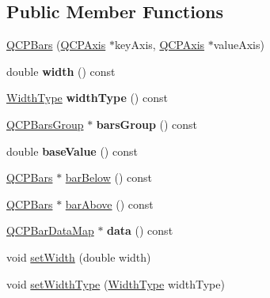 \subsection*{Public Member Functions}
\begin{DoxyCompactItemize}
\item 
\mbox{\hyperlink{class_q_c_p_bars_a64006999ad9dff308f40df41cef176ad}{Q\+C\+P\+Bars}} (\mbox{\hyperlink{class_q_c_p_axis}{Q\+C\+P\+Axis}} $\ast$key\+Axis, \mbox{\hyperlink{class_q_c_p_axis}{Q\+C\+P\+Axis}} $\ast$value\+Axis)
\item 
\mbox{\label{class_q_c_p_bars_abe7eb3987d8711f45829db879aee2280}} 
double {\bfseries width} () const
\item 
\mbox{\label{class_q_c_p_bars_a4c103fb405a45f47853e0345f0c6e708}} 
\mbox{\hyperlink{class_q_c_p_bars_a65dbbf1ab41cbe993d71521096ed4649}{Width\+Type}} {\bfseries width\+Type} () const
\item 
\mbox{\label{class_q_c_p_bars_a5eef59840b68d205df4e0c3df5f97633}} 
\mbox{\hyperlink{class_q_c_p_bars_group}{Q\+C\+P\+Bars\+Group}} $\ast$ {\bfseries bars\+Group} () const
\item 
\mbox{\label{class_q_c_p_bars_a29a7b3b86f80b2a04bd1f9ec0ebaf422}} 
double {\bfseries base\+Value} () const
\item 
\mbox{\hyperlink{class_q_c_p_bars}{Q\+C\+P\+Bars}} $\ast$ \mbox{\hyperlink{class_q_c_p_bars_a1b58664864b141f45e02044a855b3213}{bar\+Below}} () const
\item 
\mbox{\hyperlink{class_q_c_p_bars}{Q\+C\+P\+Bars}} $\ast$ \mbox{\hyperlink{class_q_c_p_bars_ab97f2acd9f6cb40d2cc3c33d278f0e78}{bar\+Above}} () const
\item 
\mbox{\label{class_q_c_p_bars_a185bcee5f2d96fbc336a2d270687d016}} 
\mbox{\hyperlink{qcustomplot_8h_aa846c77472cae93def9f1609d0c57191}{Q\+C\+P\+Bar\+Data\+Map}} $\ast$ {\bfseries data} () const
\item 
void \mbox{\hyperlink{class_q_c_p_bars_afec6116579d44d5b706e0fa5e5332507}{set\+Width}} (double width)
\item 
void \mbox{\hyperlink{class_q_c_p_bars_adcaa3b41281bb2c0f7949b341592fcc0}{set\+Width\+Type}} (\mbox{\hyperlink{class_q_c_p_bars_a65dbbf1ab41cbe993d71521096ed4649}{Width\+Type}} width\+Type)

\end{DoxyCompactItemize}
